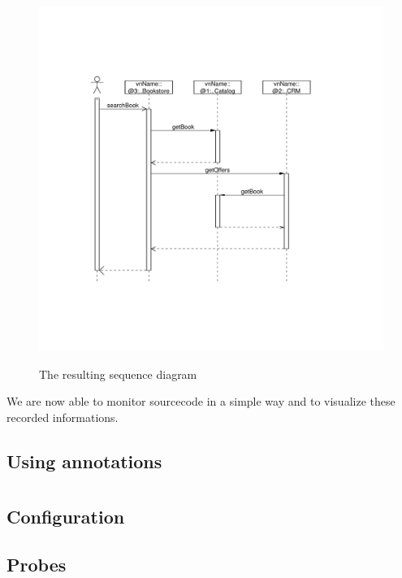 \documentclass[a4paper, oneside, 11pt]{scrartcl}
\begin{document}
\begin{figure}[H]
	\begin{center}
		\includegraphics[width=1.0\textwidth]{sequenceDiagram.pdf}
		\label{image:sequencediagram}
		\caption{The resulting sequence diagram}
	\end{center}
\end{figure}
We are now able to monitor sourcecode in a simple way and to visualize these recorded informations.

\subsection*{Using annotations}


\section{\KiekerMonitoring}
\subsection{Configuration}
\subsection{Probes}
\end{document}
